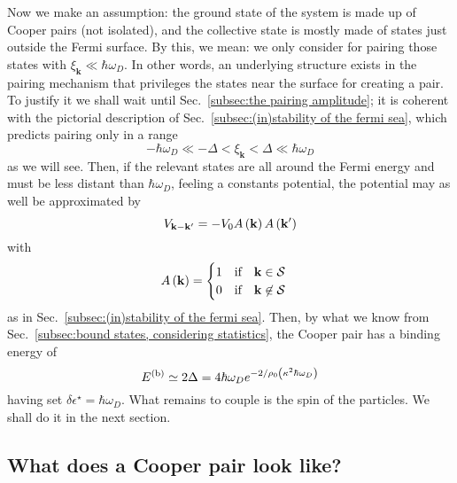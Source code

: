 Now we make an assumption: the ground state of the system is made up of Cooper pairs (not isolated), and the collective state is mostly made of states just outside the Fermi surface. By this, we mean: we only consider for pairing those states with $\xi_\mathbf{k} \ll \hbar\omega_D$. In other words, an underlying structure exists in the pairing mechanism that privileges the states near the surface for creating a pair. To justify it we shall wait until Sec.~\ref{subsec:the pairing amplitude}; it is coherent with the pictorial description of Sec.~\ref{subsec:(in)stability of the fermi sea}, which predicts pairing only in a range
\[
	-\hbar \omega_D \ll -\Delta < \xi_\mathbf{k} < \Delta \ll \hbar\omega_D
\]
as we will see. Then, if the relevant states are all around the Fermi energy and must be less distant than $\hbar\omega_D$, feeling a constants potential, the potential may as well be approximated by
\[
	V_{\mathbf{k}-\mathbf{k}'} = -V_0 A\left({\mathbf{k}}\right) A\left({\mathbf{k}'}\right)
\]
with
\[
	A\lrR{\mathbf{k}} = \begin{cases}
		1 \qq{if} \mathbf{k} \in \mathcal{S} \\
		0 \qq{if} \mathbf{k} \not\in \mathcal{S}
	\end{cases}
\]
as in Sec.~\ref{subsec:(in)stability of the fermi sea}. Then, by what we know from Sec.~\ref{subsec:bound states, considering statistics}, the Cooper pair has a binding energy of
\[
	E^{(\mathrm{b})} \simeq 2\Delta = 4 \hbar\omega_D e^{-2/\rho_0 \left({\kappa^2 \hbar\omega_D}\right)}
\]
having set $\delta\epsilon^\star = \hbar\omega_D$. What remains to couple is the spin of the particles. We shall do it in the next section.

\subsection{What does a Cooper pair look like?}\label{subsec:what does a cooper pair look like}

